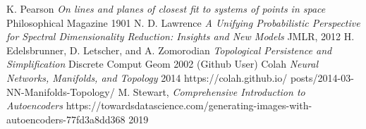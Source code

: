 \documentclass[a4paper,12pt]{report}
\theoremstyle{definition}
\begin{document}
 \begin{thebibliography}{}
  K. Pearson {\em On lines and planes of closest fit to systems of points in space} Philosophical Magazine 1901
  N. D. Lawrence {\em A Unifying Probabilistic Perspective for Spectral Dimensionality Reduction: Insights and New Models} JMLR, 2012
  H. Edelsbrunner, D. Letscher, and A. Zomorodian {\em Topological Persistence and Simplification} Discrete Comput Geom 2002
  (Github User) Colah {\em Neural Networks, Manifolds, and Topology} 2014 https://colah.github.io/ posts/2014-03-NN-Manifolds-Topology/
  M. Stewart, {\em Comprehensive Introduction to Autoencoders} https://towardsdatascience.com/generating-images-with-autoencoders-77fd3a8dd368 2019
 \end{thebibliography}
\end{document}
